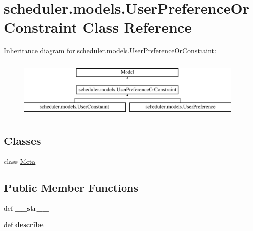 \hypertarget{classscheduler_1_1models_1_1_user_preference_or_constraint}{\section{scheduler.\-models.\-User\-Preference\-Or\-Constraint Class Reference}
\label{classscheduler_1_1models_1_1_user_preference_or_constraint}
}
Inheritance diagram for scheduler.\-models.\-User\-Preference\-Or\-Constraint\-:\begin{figure}[H]
\begin{center}
\leavevmode
\includegraphics[height=2.947368cm]{classscheduler_1_1models_1_1_user_preference_or_constraint}
\end{center}
\end{figure}
\subsection*{Classes}
\begin{DoxyCompactItemize}
\item 
class \hyperlink{classscheduler_1_1models_1_1_user_preference_or_constraint_1_1_meta}{Meta}
\end{DoxyCompactItemize}
\subsection*{Public Member Functions}
\begin{DoxyCompactItemize}
\item 
\hypertarget{classscheduler_1_1models_1_1_user_preference_or_constraint_a1b04b83430b49ef79badd95682e6cf4e}{def {\bfseries \-\_\-\-\_\-str\-\_\-\-\_\-}}\label{classscheduler_1_1models_1_1_user_preference_or_constraint_a1b04b83430b49ef79badd95682e6cf4e}

\item 
\hypertarget{classscheduler_1_1models_1_1_user_preference_or_constraint_a8198615fa62dee4ea1cb89fe6ab834e0}{def {\bfseries describe}}\label{classscheduler_1_1models_1_1_user_preference_or_constraint_a8198615fa62dee4ea1cb89fe6ab834e0}

\end{DoxyCompactItemize}
